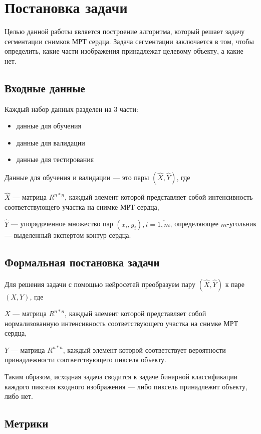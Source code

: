 \section{Постановка задачи}

Целью данной работы является построение алгоритма, который решает задачу сегментации снимков МРТ сердца. Задача сегментации заключается в том, чтобы определить, какие части изображения принадлежат целевому объекту, а какие нет. 

\subsection{Входные данные}

Каждый набор данных разделен на 3 части: 

\begin{itemize}
  \item данные для обучения
  \item данные для валидации
  \item данные для тестирования
\end{itemize}

Данные для обучения и валидации — это пары $(\hat{X},\hat{Y})$, где

  $\hat{X}$ — матрица $R^{n*n}$, каждый элемент которой представляет собой интенсивность соответствующего участка на снимке МРТ сердца,
  
  $\hat{Y}$ — упорядоченное множество пар $(x_{i},y_{i}), i = \overline{1,m}$, определяющее $m$-угольник — выделенный экспертом контур сердца.

\subsection{Формальная постановка задачи}

Для решения задачи с помощью нейросетей преобразуем пару $(\hat{X},\hat{Y})$ к паре $(X,Y)$, где

  $X$ — матрица $R^{n*n}$, каждый элемент которой представляет собой нормализованную интенсивность соответствующего участка на снимке МРТ сердца,

  $Y$ — матрица $R^{n*n}$, каждый элемент которой соответствует вероятности принадлежности соответствующего пикселя объекту. 

Таким образом, исходная задача сводится к задаче бинарной классификации каждого пикселя входного изображения — либо пиксель принадлежит объекту, либо нет.

\subsection{Метрики}

